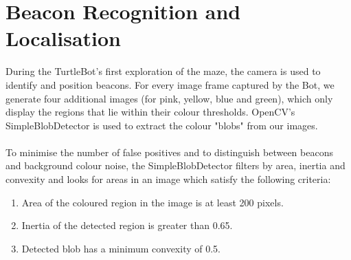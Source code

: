 \documentclass[titlepage,12pt,a4paper]{article}
\begin{document}
\pagebreak


\section*{Beacon Recognition and Localisation}

During the TurtleBot's first exploration of the maze, the camera is used to identify and position beacons. For every image frame captured by the Bot, we generate four additional images (for pink, yellow, blue and green), which only display the regions that lie within their colour thresholds. OpenCV's SimpleBlobDetector is used to extract the colour "blobs" from our images.\\
\\
To minimise the number of false positives and to distinguish between beacons and background colour noise, the SimpleBlobDetector filters by area, inertia and convexity and looks for areas in an image which satisfy the following criteria:

	\begin{enumerate}
		\item Area of the coloured region in the image is at least 200 pixels.
		\item Inertia of the detected region is greater than 0.65.
		\item Detected blob has a minimum convexity of 0.5.\\
	\end{enumerate}
\end{document}
